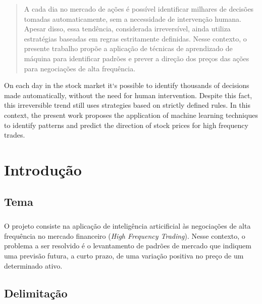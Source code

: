 \documentclass[grad,numbers]{coppe}
\begin{document}
  \begin{abstract}

  A cada dia no mercado de ações é possível identificar milhares de decisões tomadas automaticamente, sem a necessidade de intervenção humana. Apesar disso, essa tendência, considerada irreversível, ainda utiliza estratégias baseadas em regras estritamente definidas. Nesse contexto, o presente trabalho propõe a aplicação de técnicas de aprendizado de máquina para identificar padrões e prever a direção dos preços das ações para negociações de alta frequência.

  \end{abstract}

  \begin{foreignabstract}

  On each day in the stock market it`s possible to identify thousands of decisions made automatically, without the need for human intervention. Despite this fact, this irreversible trend still uses strategies based on strictly defined rules. In this context, the present work proposes the application of machine learning techniques to identify patterns and predict the direction of stock prices for high frequency trades.

  \end{foreignabstract}

  \tableofcontents
  \listoffigures
  \listoftables
  \printlosymbols
  \printloabbreviations

  \mainmatter
\chapter{Introdução}
  
  \section{Tema}
    
    \paragraph{}O projeto consiste na aplicação de inteligência articificial às negociações de alta frequência no mercado financeiro (\textit{High Frequency Trading}). Nesse contexto, o problema a ser resolvido é o levantamento de padrões de mercado que indiquem uma previsão futura, a curto prazo, de uma variação positiva no preço de um determinado ativo.
    
  \section{Delimitação}
\end{document}
